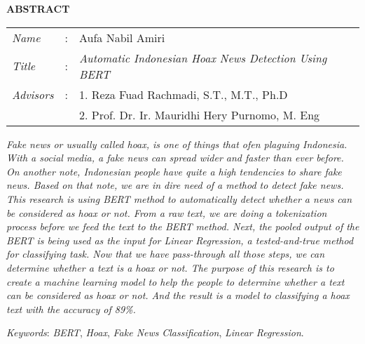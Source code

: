 \begin{center}
  \large\textbf{ABSTRACT}
\end{center}


\vspace{2ex}

\begingroup
\setlength{\tabcolsep}{0pt}

\noindent
\begin{tabularx}{\textwidth}{l >{\centering}m{3em} X}
  \emph{Name}     & : & Aufa Nabil Amiri                                             \\

  \emph{Title}    & : & \emph{ Automatic Indonesian Hoax News Detection Using BERT } \\

  \emph{Advisors} & : & 1. Reza Fuad Rachmadi, S.T., M.T., Ph.D                      \\
                  &   & 2. Prof. Dr. Ir. Mauridhi Hery Purnomo, M. Eng               \\
\end{tabularx}
\endgroup

\textit{
  Fake news or usually called hoax, is one of things that ofen plaguing Indonesia. With a social media, a fake news can spread wider and faster than ever before. On another note, Indonesian people have quite a high tendencies to share fake news. Based on that note, we are in dire need of a method to detect fake news. This research is using BERT method to automatically detect whether a news can be considered as hoax or not. From a raw text, we are doing a tokenization process before we feed the text to the BERT method. Next, the pooled output of the BERT is being used as the input for Linear Regression, a tested-and-true method for classifying task. Now that we have pass-through all  those steps, we can determine whether a text is a hoax or not. The purpose of this research is to create a machine learning model to help the people to determine whether a text can be considered as hoax or not. And the result is a model to classifying a hoax text with the accuracy of 89\%.
}

\emph{Keywords}: \emph{BERT}, \emph{Hoax}, \emph{Fake News} \emph{Classification}, \emph{Linear Regression}.
